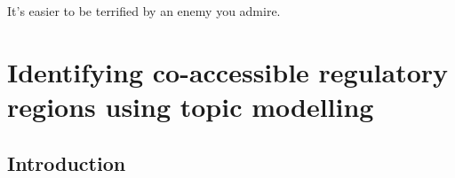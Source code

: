 \begin{savequote}[8cm]
  It's easier to be terrified by an enemy you admire.
\end{savequote}

\chapter{Identifying co-accessible regulatory regions using topic modelling} \label{ch4}

\minitoc

\providecommand{\tightlist}{%
  \setlength{\itemsep}{0pt}\setlength{\parskip}{0pt}}


\section{Introduction} \label{ch4:intro}

